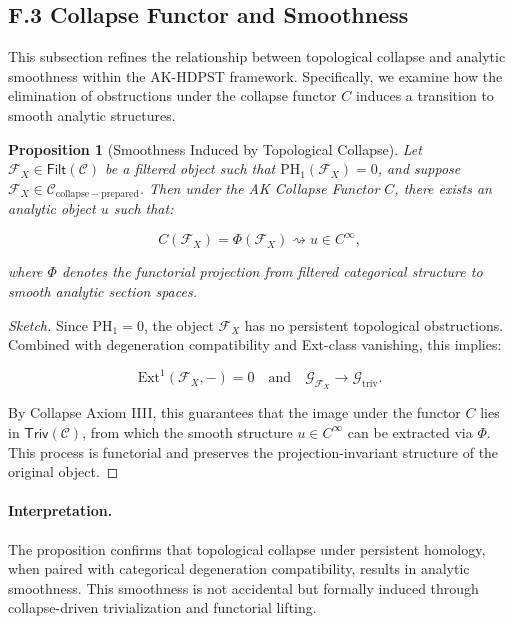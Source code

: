 \documentclass[11pt]{article}
\newtheorem{proposition}[theorem]{Proposition}
\begin{document}
\subsection*{F.3 Collapse Functor and Smoothness}

This subsection refines the relationship between topological collapse and analytic smoothness within the AK-HDPST framework. Specifically, we examine how the elimination of obstructions under the collapse functor \( C \) induces a transition to smooth analytic structures.

\begin{proposition}[Smoothness Induced by Topological Collapse]
\label{prop:smoothness-collapse}
Let \( \mathcal{F}_X \in \mathsf{Filt}(\mathcal{C}) \) be a filtered object such that \( \mathrm{PH}_1(\mathcal{F}_X) = 0 \), and suppose \( \mathcal{F}_X \in \mathcal{C}_{\mathrm{collapse-prepared}} \). Then under the AK Collapse Functor \( C \), there exists an analytic object \( u \) such that:

\[
C(\mathcal{F}_X) = \Phi(\mathcal{F}_X) \rightsquigarrow u \in C^\infty,
\]

where \( \Phi \) denotes the functorial projection from filtered categorical structure to smooth analytic section spaces.
\end{proposition}

\begin{proof}[Sketch]
Since \( \mathrm{PH}_1 = 0 \), the object \( \mathcal{F}_X \) has no persistent topological obstructions. Combined with degeneration compatibility and Ext-class vanishing, this implies:

\[
\mathrm{Ext}^1(\mathcal{F}_X, -) = 0 \quad \text{and} \quad \mathcal{G}_{\mathcal{F}_X} \longrightarrow \mathcal{G}_{\mathrm{triv}}.
\]

By Collapse Axiom IIII, this guarantees that the image under the functor \( C \) lies in \( \mathsf{Triv}(\mathcal{C}) \), from which the smooth structure \( u \in C^\infty \) can be extracted via \( \Phi \). This process is functorial and preserves the projection-invariant structure of the original object.
\end{proof}

\paragraph{Interpretation.} The proposition confirms that topological collapse under persistent homology, when paired with categorical degeneration compatibility, results in analytic smoothness. This smoothness is not accidental but formally induced through collapse-driven trivialization and functorial lifting.
\end{document}
